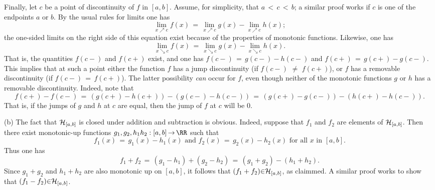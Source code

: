 {        Finally, let $c$ be a point of discontinuity of $f$ in $[a,b]$.
    Assume, for simplicity, that $a\,<\,c\,<\,b$; a similar proof works if $c$ is one of the endpoints $a$ or $b$.
    By the usual rules for limits one has
        \begin{displaymath}
        \lim_{x{\nearrow}c} f(x) \,=\, \lim_{x{\nearrow}c} g(x) - \lim_{x{\nearrow}c} h(x);
        \end{displaymath}
    the one-sided limits on the right side of this equation exist because of the properties of monotonic functions.
    Likewise, one has
        \begin{displaymath}
        \lim_{x{\searrow}c} f(x) \,=\, \lim_{x{\searrow}c} g(x) - \lim_{x{\searrow}c} h(x).
        \end{displaymath}
    That is, the quantities $f(c-)$ and $f(c+)$ exist, and one has $f(c-) \,=\, g(c-)-h(c-)$ and $f(c+) \,=\, g(c+)-g(c-)$.
    This implies that at such a point either the function $f$ has a jump discontinuity (if $f(c-) \,\,{\neq}\,\, f(c+)$),
    or $f$ has a removable discontinuity (if $f(c-) \,=\, f(c+)$).
    The latter possibility {\em can} occur for $f$, even though neither of the monotonic functions $g$ or $h$ has a removable discontinuity.
    Indeed, note that
        \begin{displaymath}
        f(c+)-f(c-) \,=\, (g(c+)-h(c+)) - (g(c-) - h(c-)) \,=\, (g(c+)-g(c-)) - (h(c+)-h(c-)).
        \end{displaymath}
    That is, if the jumps of $g$ and $h$ at $c$ are equal, then the jump of $f$ at $c$ will be $0$.

\V

        (b) The fact that ${\cal H}_{[a,b]}$ is closed under addition and subtraction is obvious.
    Indeed, suppose that $f_{1}$ and $f_{2}$ are elements of ${\cal H}_{[a,b]}$.
    Then there exist monotonic-up functions $g_{1},g_{2},h_{1}h_{2}:[a,b] \,{\rightarrow}\, {\RR}$ such that
        \begin{displaymath}
        f_{1}(x) \,=\, g_{1}(x)-h_{1}(x) \mbox{ and }
        f_{2}(x) \,=\, g_{2}(x)-h_{2}(x) \mbox{ for all $x$ in $[a,b]$}.
        \end{displaymath}
    Thus one has
        \begin{displaymath}
        f_{1}+f_{2} \,=\, (g_{1}-h_{1}) + (g_{2}-h_{2})
     \,=\, (g_{1} + g_{2}) - (h_{1} + h_{2}).
        \end{displaymath}
    Since $g_{1}+g_{2}$ and $h_{1}+h_{2}$ are also monotonic up on $[a,b]$,
    it follows that $(f_{1}+f_{2}){\in}{\cal H}_{[a,b]}$, as claimmed.
    A similar proof works to show that $(f_{1}-f_{2}){\in}{\cal H}_{[a,b]}$.

}
